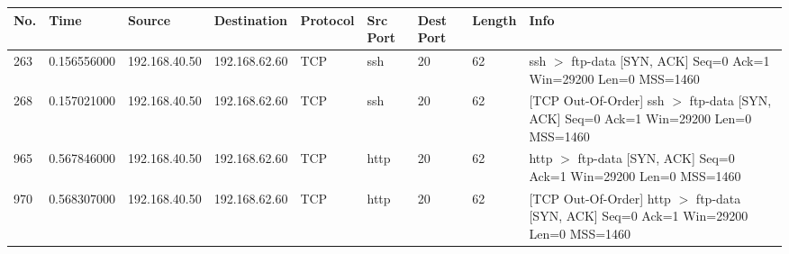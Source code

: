 \begin{center}
\begin{longtable}{|l|l|l|l|l|l|l|l|p{2.5cm}|}
\hline
{\tiny{\textbf{No.}}} & {\tiny{\textbf{Time}}} & {\tiny{\textbf{Source}}} & {\tiny{\textbf{Destination}}} & {\tiny{\textbf{Protocol}}} & {\tiny{\textbf{Src Port}}} & {\tiny{\textbf{Dest Port}}} & {\tiny{\textbf{Length}}} & {\tiny{\textbf{Info}}} \\
\hline
\endhead
263 & 0.156556000 & 192.168.40.50 & 192.168.62.60 & TCP & ssh & 20 & 62 & ssh $>$ ftp-data [SYN, ACK] Seq=0 Ack=1 Win=29200 Len=0 MSS=1460 \\
\hline
268 & 0.157021000 & 192.168.40.50 & 192.168.62.60 & TCP & ssh & 20 & 62 & [TCP Out-Of-Order] ssh $>$ ftp-data [SYN, ACK] Seq=0 Ack=1 Win=29200 Len=0 MSS=1460 \\
\hline
965 & 0.567846000 & 192.168.40.50 & 192.168.62.60 & TCP & http & 20 & 62 & http $>$ ftp-data [SYN, ACK] Seq=0 Ack=1 Win=29200 Len=0 MSS=1460 \\
\hline
970 & 0.568307000 & 192.168.40.50 & 192.168.62.60 & TCP & http & 20 & 62 & [TCP Out-Of-Order] http $>$ ftp-data [SYN, ACK] Seq=0 Ack=1 Win=29200 Len=0 MSS=1460 \\
\hline
\end{longtable}
\end{center}
